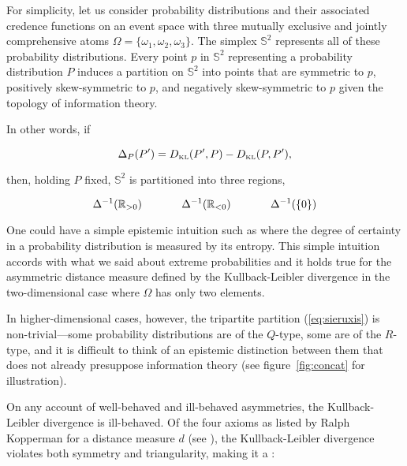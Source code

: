 \documentclass[smallextended]{svjour3}       %
\begin{document}
For simplicity, let us consider probability distributions and their
associated credence functions on an event space with three mutually
exclusive and jointly comprehensive atoms
$\Omega=\{\omega_{1},\omega_{2},\omega_{3}\}$. The simplex
$\mathbb{S}^{2}$ represents all of these probability distributions.
Every point $p$ in $\mathbb{S}^{2}$ representing a probability
distribution $P$ induces a partition on $\mathbb{S}^{2}$ into points
that are symmetric to $p$, positively skew-symmetric to $p$, and
negatively skew-symmetric to $p$ given the topology of information
theory.

In other words, if

\begin{equation}
  \label{eq:sksy}
  \Delta_{P}(P')=D_{\mbox{\tiny KL}}(P',P)-D_{\mbox{\tiny KL}}(P,P'),
\end{equation}

then, holding $P$ fixed, $\mathbb{S}^{2}$ is partitioned into three
regions, 

\begin{equation}
  \label{eq:sieruxis}
  \Delta^{-1}(\mathbb{R}_{>0})\hspace{.5in}\Delta^{-1}(\mathbb{R}_{<0})\hspace{.5in}\Delta^{-1}(\{0\})
\end{equation}

One could have a simple epistemic intuition such as 
where the degree of certainty in a probability distribution is
measured by its entropy. This simple intuition accords with what we
said about extreme probabilities and it holds true for the asymmetric
distance measure defined by the Kullback-Leibler divergence in the
two-dimensional case where $\Omega$ has only two elements.

In higher-dimensional cases, however, the tripartite partition
(\ref{eq:sieruxis}) is non-trivial---some probability distributions
are of the $Q$-type, some are of the $R$-type, and it is difficult to
think of an epistemic distinction between them that does not already
presuppose information theory (see figure~\ref{fig:concat} for
illustration).

On any account of well-behaved and ill-behaved asymmetries, the
Kullback-Leibler divergence is ill-behaved. Of the four axioms as
listed by Ralph Kopperman for a distance measure $d$ (see
), the Kullback-Leibler divergence violates
both symmetry and triangularity, making it a :
\end{document}
